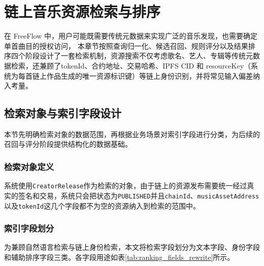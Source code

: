 
\chapter{链上音乐资源检索与排序}\label{ch:search_ranking}

在 FreeFlow 中，用户可能既需要传统元数据来实现广泛的音乐发现，也需要确定单首曲目的授权访问，
本章节按照查询归一化、候选召回、规则评分以及结果排序四个阶段设计了一套检索机制，资源搜索不仅考虑歌名、艺人、专辑等传统元数据检索，还兼顾了tokenId、合约地址、交易哈希、IPFS CID 和 resourceKey（系统为每首链上作品生成的唯一资源标识键）等链上身份识别，并将常见输入偏差纳入考量。

\section{检索对象与索引字段设计}

本节先明确检索对象的数据范围，再根据业务场景对索引字段进行分类，为后续的召回与评分阶段提供结构化的数据基础。

\subsection{检索对象定义}

系统使用\texttt{CreatorRelease}作为检索的对象，由于链上的资源发布需要统一经过真实的签名和交易，系统只会把状态为\texttt{PUBLISHED}并且\texttt{chainId}、\texttt{musicAssetAddress}以及\texttt{tokenId}这几个字段都不为空的资源纳入到检索的范围中。

\subsection{索引字段划分}

为兼顾自然语言检索与链上身份检索，本文将检索字段划分为文本字段、身份字段和辅助排序字段三类。各字段用途如表\ref{tab:ranking_fields_rewrite}所示。

